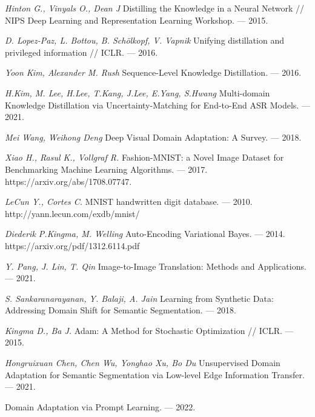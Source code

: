 \newpage


\begin{thebibliography}{99}
	\textit{Hinton G., Vinyals O., Dean J} Distilling the Knowledge in a Neural Network // NIPS Deep Learning and Representation Learning Workshop. — 2015.
    
    \textit{D. Lopez-Paz, L. Bottou, B. Schölkopf, V. Vapnik} Unifying distillation and privileged information // ICLR. — 2016.
	
	\textit{Yoon Kim, Alexander M. Rush} Sequence-Level Knowledge Distillation. — 2016.
	
	\textit{H.Kim, M. Lee, H.Lee, T.Kang, J.Lee, E.Yang, S.Hwang} Multi-domain Knowledge Distillation via Uncertainty-Matching for End-to-End ASR Models. — 2021.
	
	\textit{Mei Wang, Weihong Deng} Deep Visual Domain Adaptation: A Survey. — 2018.
	
    \textit{Xiao H., Rasul K., Vollgraf R.} Fashion-MNIST: a Novel Image Dataset for
    Benchmarking Machine Learning Algorithms. — 2017. https://arxiv.org/abs/1708.07747.
    
    \textit{LeCun Y., Cortes C.} MNIST handwritten digit database. --- 2010. http://yann.lecun.com/exdb/mnist/
    
    \textit{Diederik P.Kingma, M. Welling} Auto-Encoding Variational Bayes. --- 2014. https://arxiv.org/pdf/1312.6114.pdf
    
    \textit{Y. Pang, J. Lin, T. Qin} Image-to-Image Translation: Methods and 
    Applications. --- 2021.
    
    \textit{S. Sankaranarayanan, Y. Balaji, A. Jain} Learning from Synthetic Data: Addressing Domain Shift for Semantic Segmentation. --- 2018.
    
    \textit{Kingma D., Ba J.} Adam: A Method for Stochastic Optimization // ICLR. — 2015.
    
    \textit{Hongruixuan Chen, Chen Wu, Yonghao Xu, Bo Du} Unsupervised Domain Adaptation for Semantic Segmentation via Low-level Edge Information Transfer. --- 2021.
    
     Domain Adaptation via Prompt Learning. --- 2022.
    

\end{thebibliography}
